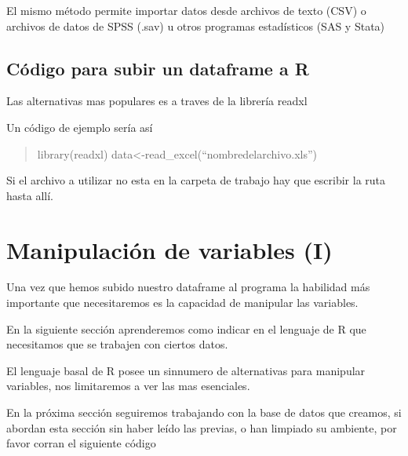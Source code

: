 \documentclass[
]{book}
\begin{document}
El mismo método permite importar datos desde archivos de texto (CSV) o archivos de datos de SPSS (.sav) u otros programas estadísticos (SAS y Stata)

\hypertarget{cuxf3digo-para-subir-un-dataframe-a-r}{%
\subsection{Código para subir un dataframe a R}\label{cuxf3digo-para-subir-un-dataframe-a-r}}

Las alternativas mas populares es a traves de la librería readxl

Un código de ejemplo sería así

\begin{quote}
library(readxl)
data\textless-read\_excel(``nombredelarchivo.xls'')
\end{quote}

Si el archivo a utilizar no esta en la carpeta de trabajo hay que escribir la ruta hasta allí.

\hypertarget{manipulaciuxf3n-de-variables-i}{%
\section{Manipulación de variables (I)}\label{manipulaciuxf3n-de-variables-i}}

Una vez que hemos subido nuestro dataframe al programa la habilidad más importante que necesitaremos es la capacidad de manipular las variables.

En la siguiente sección aprenderemos como indicar en el lenguaje de R que necesitamos que se trabajen con ciertos datos.

El lenguaje basal de R posee un sinnumero de alternativas para manipular variables, nos limitaremos a ver las mas esenciales.

En la próxima sección seguiremos trabajando con la base de datos que creamos, si abordan esta sección sin haber leído las previas, o han limpiado su ambiente, por favor corran el siguiente código
\end{document}
